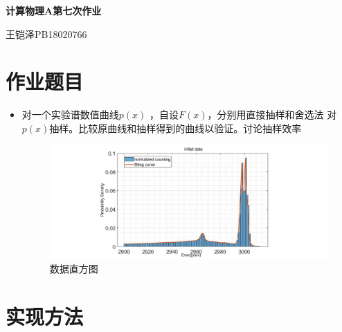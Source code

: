 \documentclass[UTF8]{ctexart}
\begin{document}
	\centering\textbf{\LARGE{计算物理A第七次作业}}
	
	
	王铠泽\qquad PB18020766
	
		
	\section{作业题目}
	
	\begin{itemize}
		\item 对一个实验谱数值曲线$  p(x) $ ，自设$  F(x) $，分别用直接抽样和舍选法
		对$p(x)$抽样。比较原曲线和抽样得到的曲线以验证。讨论抽样效率
			\begin{figure}[H]
			\centering\includegraphics[width=6in]{../figure/curve}
			\caption{数据直方图}
			\end{figure}
	\end{itemize}
	
	\section{实现方法}
	
\end{document}
